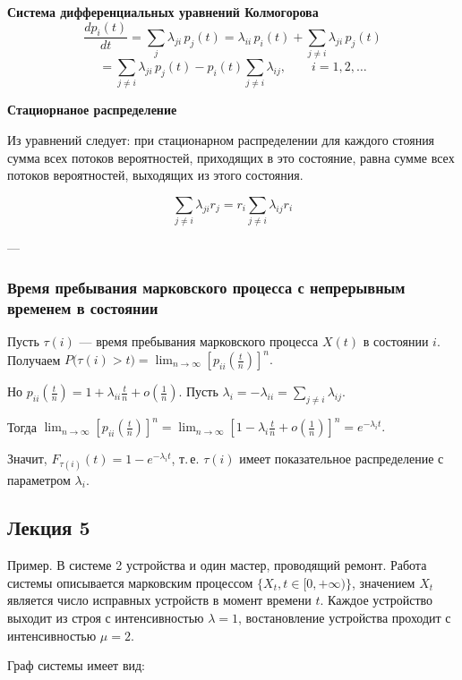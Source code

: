 \vspace{1em}

\textbf{Система дифференциальных уравнений Колмогорова}
\[
	\frac{dp_i(t)}{dt}
	= \sum_j \lambda_{ji}\,p_j(t)
	= \lambda_{ii}\,p_i(t)
	+ \sum_{j \ne i} \lambda_{ji}\,p_j(t)
\]
\[
	= \sum_{j \ne i} \lambda_{ji}\,p_j(t)
	- p_i(t)\sum_{j \ne i} \lambda_{ij},
	\qquad i = 1, 2, \ldots
\]

\textbf{Стациорнаное распределение}

Из уравнений следует: при стационарном распределении для каждого стояния сумма всех потоков вероятностей, приходящих в это состояние, равна сумме всех потоков вероятностей, выходящих из этого состояния.

\[
	\sum_{j \ne i} \lambda_{ji} r_j = r_i \sum_{j \ne i} \lambda_{ij} r_i
\]

---

\subsubsection*{Время пребывания марковского процесса с непрерывным временем в состоянии}

Пусть $\tau(i)$ — время пребывания марковского процесса $X(t)$ в состоянии $i$.
Получаем
$P\bigl(\tau(i) > t\bigr)= \lim_{n \to \infty} [p_{ii}(\frac{t}{n})]^n.$

Но $p_{ii}\!\left(\tfrac{t}{n}\right)= 1 + \lambda_{ii}\tfrac{t}{n} + o\!\left(\tfrac{1}{n}\right).$
Пусть $\lambda_i = -\lambda_{ii} = \sum_{j \ne i} \lambda_{ij}$.

Тогда
$\lim_{n \to \infty} [p_{ii}(\frac{t}{n})]^n
	= \lim_{n \to \infty}
	\left[1 - \lambda_i \tfrac{t}{n} + o\!\left(\tfrac{1}{n}\right)\right]^n
	= e^{-\lambda_i t}.$

Значит, $F_{\tau(i)}(t) = 1 - e^{-\lambda_i t}$,
т.\,е. $\tau(i)$ имеет показатель­ное распределение с параметром $\lambda_i$.


\subsection{Лекция 5}

Пример. В системе 2 устройства и один мастер, проводящий ремонт.
Работа системы описывается марковским процессом $\{X_t, t\in [0, +\infty) \}$,
значением $X_t$ является число исправных устройств в момент времени $t$.
Каждое устройство выходит из строя с интенсивностью $\lambda=1$,
востановление устройства проходит с интенсивностью $\mu=2$.

Граф системы имеет вид:

